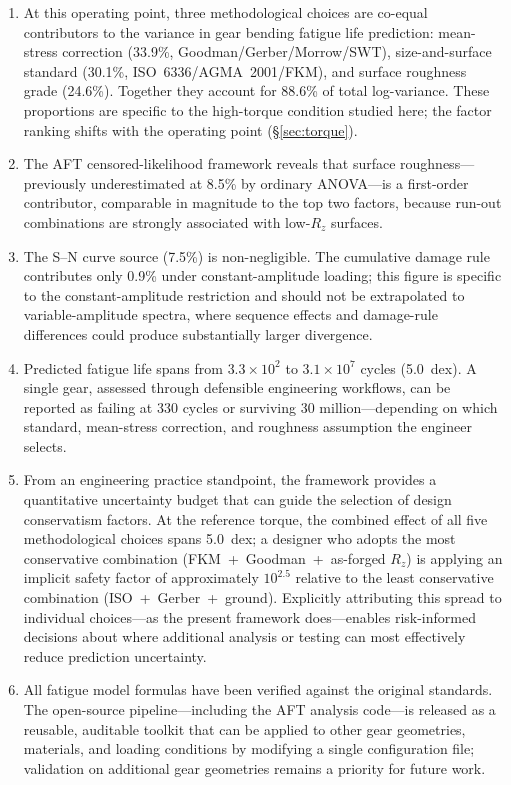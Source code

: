 \documentclass[12pt,a4paper]{article}
\begin{document}
\begin{enumerate}
  \item At this operating point, three methodological choices are co-equal
        contributors to the variance in gear bending fatigue life
        prediction: mean-stress correction (33.9\%,
        Goodman/Gerber/Morrow/SWT), size-and-surface standard (30.1\%,
        ISO~6336/AGMA~2001/FKM), and surface roughness grade (24.6\%).
        Together they account for 88.6\% of total log-variance. These
        proportions are specific to the high-torque condition studied here;
        the factor ranking shifts with the operating point
        (\S\ref{sec:torque}).
  \item The AFT censored-likelihood framework reveals that surface
        roughness---previously underestimated at 8.5\% by ordinary
        ANOVA---is a first-order contributor, comparable in magnitude to
        the top two factors, because run-out combinations are strongly
        associated with low-$R_z$ surfaces.
  \item The S--N curve source (7.5\%) is non-negligible. The cumulative
        damage rule contributes only 0.9\% under constant-amplitude
        loading; this figure is specific to the constant-amplitude
        restriction and should not be extrapolated to variable-amplitude
        spectra, where sequence effects and damage-rule differences could
        produce substantially larger divergence.
  \item Predicted fatigue life spans from $3.3\times10^2$ to
        $3.1\times10^7$ cycles (5.0~dex). A single gear, assessed
        through defensible engineering workflows, can be reported as
        failing at 330 cycles or surviving 30 million---depending on
        which standard, mean-stress correction, and roughness
        assumption the engineer selects.
  \item From an engineering practice standpoint, the framework provides
        a quantitative uncertainty budget that can guide the selection
        of design conservatism factors. At the reference torque, the
        combined effect of all five methodological choices spans
        5.0~dex; a designer who adopts the most conservative combination
        (FKM~+~Goodman~+~as-forged $R_z$) is applying an implicit
        safety factor of approximately $10^{2.5}$ relative to the least
        conservative combination (ISO~+~Gerber~+~ground). Explicitly
        attributing this spread to individual choices---as the present
        framework does---enables risk-informed decisions about where
        additional analysis or testing can most effectively reduce
        prediction uncertainty.
  \item All fatigue model formulas have been verified against the
        original standards. The open-source pipeline---including
        the AFT analysis code---is released as a reusable, auditable
        toolkit that can be applied to other gear geometries, materials,
        and loading conditions by modifying a single configuration file; validation on
        additional gear geometries remains a priority for future work.
\end{enumerate}
\end{document}
